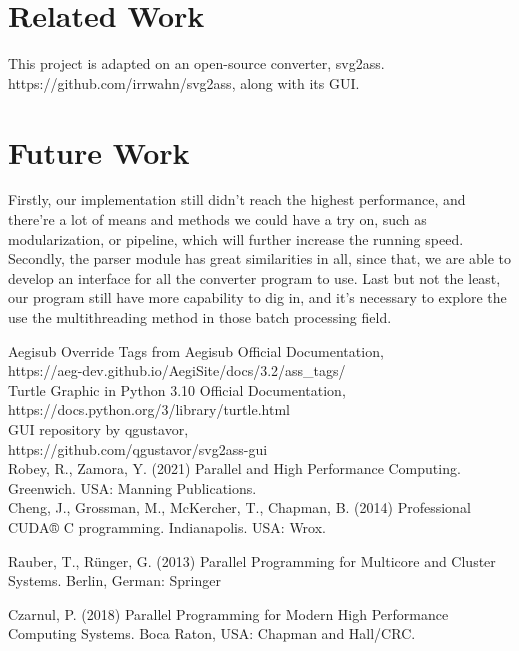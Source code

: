 \documentclass[10pt,twocolumn,letterpaper]{article}
\numberwithin{figure}{section}
\begin{document}
\section*{Related Work}

This project is adapted on an open-source converter, svg2ass. https://github.com/irrwahn/svg2ass, along with its GUI. 

\section*{Future Work}

Firstly, our implementation still didn't reach the highest performance, and there're a lot of means and methods we could have a try on, such as modularization, or pipeline, which will further increase the running speed.\\
Secondly, the parser module has great similarities in all, since that, we are able to develop an interface for all the converter program to use.
Last but not the least, our program still have more capability to dig in, and it's necessary to explore the use the multithreading method in those batch processing field.

\begin{thebibliography}{9}


 Aegisub Override Tags from Aegisub Official Documentation, \\ https://aeg-dev.github.io/AegiSite/docs/3.2/ass\_tags/ \\

 Turtle Graphic in Python 3.10 Official Documentation, https://docs.python.org/3/library/turtle.html \\

 GUI repository by qgustavor, \\ https://github.com/qgustavor/svg2ass-gui \\

 Robey, R., Zamora, Y. (2021) Parallel and High Performance Computing. Greenwich. USA: Manning Publications. \\

 Cheng, J., Grossman, M., McKercher, T., Chapman, B. (2014) Professional CUDA® C programming. Indianapolis. USA: Wrox.

 Rauber, T., Rünger, G. (2013) Parallel Programming for Multicore and Cluster Systems. Berlin, German: Springer

 Czarnul, P. (2018) Parallel Programming for Modern High Performance Computing Systems. Boca Raton, USA: Chapman and Hall/CRC.

\end{thebibliography}
\end{document}

